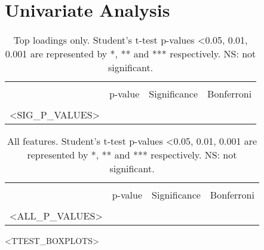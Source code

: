 \documentclass[]{article}
\begin{document}
\newpage

\section*{Univariate Analysis}

    \begin{longtable}{ c c c c }
    \caption{Top loadings only. Student's t-test p-values \textless 0.05, 0.01, 0.001 are represented by *, ** and 
    *** respectively. NS: not significant.} \label{tab:long} \\
    \hline \\
        & p-value & Significance & Bonferroni \\
    \hline \\
    \endfirsthead
    \endhead
    <SIG_P_VALUES>   
    \end{longtable}

    \newpage

    \begin{longtable}{ c c c c }
    \caption{All features. Student's t-test p-values \textless 0.05, 0.01, 0.001 are represented by *, ** and 
    *** respectively. NS: not significant.} \label{tab:long} \\
    \hline \\
        & p-value & Significance & Bonferroni \\
    \hline \\
    \endfirsthead
    \endhead
    <ALL_P_VALUES>   
    \end{longtable}

    \newpage

    <TTEST_BOXPLOTS>
\end{document}
